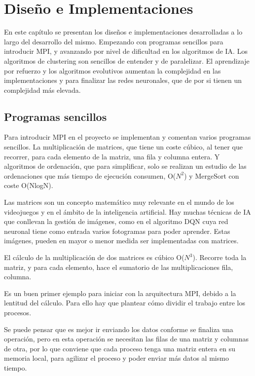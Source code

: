 

\chapter{Diseño e Implementaciones}
\label{cap:c3_implementaciones}	
En este capítulo se presentan los diseños e implementaciones desarrolladas a lo largo del desarrollo del mismo. Empezando con programas sencillos para introducir MPI, y avanzando por nivel de dificultad en los algoritmos de IA. Los algoritmos de clustering son sencillos de entender y de paralelizar. El aprendizaje por refuerzo y los algoritmos evolutivos aumentan la complejidad en las implementaciones y para finalizar las redes neuronales, que de por si tienen un complejidad más elevada.

\section{Programas sencillos}

Para introducir MPI en el proyecto se implementan y comentan varios programas sencillos. La multiplicación de matrices, que tiene un coste cúbico, al tener que recorrer, para cada elemento de la matriz, una fila y columna entera. Y algoritmos de ordenación, que para simplificar, solo se realizan un estudio de las ordenaciones que más tiempo de ejecución consumen, O(\(N^{2}\)) y MergeSort con coste O(NlogN).


Las matrices son un concepto matemático muy relevante en el mundo de los videojuegos y en el ámbito de la inteligencia artificial. Hay muchas técnicas de IA que conllevan la gestión de imágenes, como en el algoritmo DQN cuya red neuronal tiene como entrada varios fotogramas para poder aprender. Estas imágenes, pueden en mayor o menor medida ser implementadas con matrices.

El cálculo de la multiplicación de dos matrices es cúbico O(\(N^{3}\)). Recorre toda la matriz, y para cada elemento, hace el sumatorio de las multiplicaciones fila, columna. 

Es un buen primer ejemplo para iniciar con la arquitectura MPI, debido a la lentitud del cálculo. Para ello hay que plantear cómo dividir el trabajo entre los procesos. 

Se puede pensar que es mejor ir enviando los datos conforme se finaliza una operación, pero en esta operación se necesitan las filas de una matriz y columnas de otra, por lo que conviene que cada proceso tenga una matriz entera en su memoria local, para agilizar el proceso y poder enviar más datos al mismo tiempo.


